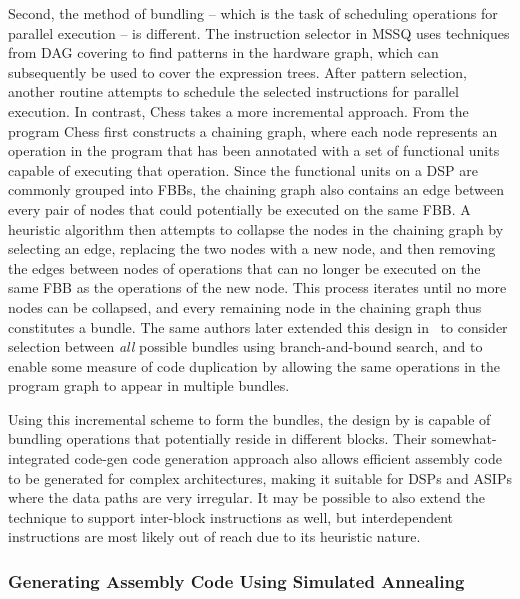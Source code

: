 Second, the method of \gls{bundling} -- which is the task of scheduling
operations for parallel execution -- is different.
%
The \gls{instruction
  selector} in \gls{MSSQ} uses techniques from \gls{DAG covering} to find
\glspl{pattern} in the hardware \gls{graph}, which can subsequently be used to
cover the \glspl{expression tree}.
%
After \gls{pattern selection}, another routine
attempts to schedule the selected \glspl{instruction} for parallel execution.
%
In
contrast, \gls{Chess} takes a more incremental approach.
%
From the \gls{program}
\gls{Chess} first constructs a \gls{chaining graph}, where each \gls{node}
represents an operation in the \gls{program} that has been annotated with a set
of functional units capable of executing that operation.
%
Since the functional
units on a \gls{DSP} are commonly grouped into \glspl{FBB}, the \gls{chaining
  graph} also contains an \gls{edge} between every pair of \glspl{node} that
could potentially be executed on the same \gls{FBB}.
%
A heuristic algorithm then
attempts to collapse the \glspl{node} in the \gls{chaining graph} by selecting
an \gls{edge}, replacing the two \glspl{node} with a new \gls{node}, and then
removing the \glspl{edge} between \glspl{node} of operations that can no longer
be executed on the same \gls{FBB} as the operations of the new \gls{node}.
%
This
process iterates until no more \glspl{node} can be collapsed, and every
remaining \gls{node} in the \gls{chaining graph} thus constitutes a
\gls{bundle}.
%
The same authors later extended this design in~\cite{VanPraet2001}
to consider selection between \emph{all} possible \glspl{bundle} using
\gls{branch-and-bound search}, and to enable some measure of code duplication by
allowing the same operations in the \gls{program graph} to appear in multiple
\glspl{bundle}.

Using this incremental scheme to form the \glspl{bundle}, the design by
\citeauthor{VanPraet1994} is capable of \gls{bundling} operations that
potentially reside in different \glspl{block}.
%
Their somewhat-\gls{integrated
  code-gen} \gls{code generation} approach also allows efficient \gls{assembly
  code} to be generated for complex architectures, making it suitable for
\glspl{DSP} and \glspl{ASIP} where the data paths are very irregular.
%
It may be
possible to also extend the technique to support \glspl{inter-block instruction}
as well, but \glspl{interdependent instruction} are most likely out of reach due
to its heuristic nature.


\subsubsection{Generating Assembly Code Using Simulated Annealing}

